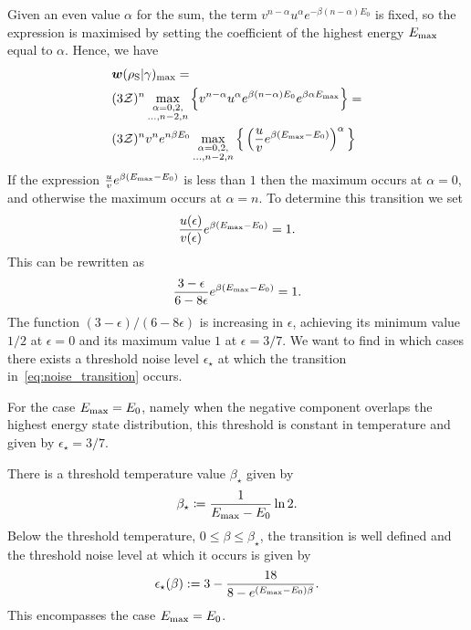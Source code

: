 \documentclass[pra,
aps,
twocolumn,
superscriptaddress,
groupedaddress,
nofootinbib,
reprint
]{revtex4-1}
\begin{document}
Given an even value $\alpha$ for the sum, the term $v^{n-\alpha} u^{\alpha} e^{-\beta (n-\alpha)E_0}$ is fixed, so the expression is maximised by setting the coefficient of the highest energy $E_{\rm{max}}$ equal to $\alpha$.
Hence, we have
\begin{align}
	&\bm{w}(\rho_{\rm{S}} | \gamma)_{\rm{max}} = \nonumber\\
	&(3\mathcal{Z})^{n} \max\limits_{\substack{\alpha = 0,2, \\ \dots,n-2,n}}{\Big\{ v^{n-\alpha} u^{\alpha} e^{\beta (n-\alpha)E_0} e^{\beta \alpha E_{\rm{max}}} \Big\}} =  \nonumber\\
	&(3\mathcal{Z})^{n} v^n e^{n\beta E_0}\max\limits_{\substack{\alpha = 0,2, \\ \dots,n-2,n}}{\Big\{ \left( \frac{u}{v} e^{\beta (E_{\rm{max}} - E_0)} \right)^{\alpha} \Big\}}
\end{align}
If the expression $\frac{u}{v} e^{\beta (E_{\rm{max}} - E_0)}$ is less than $1$ then the maximum occurs at $\alpha=0$, and otherwise the maximum occurs at $\alpha = n$. To determine this transition we set
\begin{equation}
	\frac{u(\epsilon)}{v(\epsilon)} e^{\beta (E_{\rm{max}} - E_0)} = 1.
\end{equation}
This can be rewritten as
\begin{equation}\label{eq:noise_transition}
	\frac{3-\epsilon}{6-8\epsilon} e^{\beta (E_{\rm{max}} - E_0)} = 1.
\end{equation}
The function $(3-\epsilon) / (6-8\epsilon)$ is increasing in $\epsilon$, achieving its minimum value $1/2$ at $\epsilon = 0$ and its maximum value $1$ at $\epsilon = 3/7$.
We want to find in which cases there exists a threshold noise level $\epsilon_\star$ at which the transition in~\cref{eq:noise_transition} occurs.

For the case $E_{\rm{max}} = E_0$, namely when the negative component overlaps the highest energy state distribution, this threshold is constant in temperature and given by $\epsilon_{\star} = 3/7$. 

There is a threshold temperature value $\beta_\star$ given by
\begin{equation}
	\beta_{\star} \coloneqq \frac{1}{E_{\rm{max}} - E_0} \ln2.
\end{equation}
Below the threshold temperature, $0 \leq \beta \leq \beta_\star$, the transition is well defined and the threshold noise level at which it occurs is given by
\begin{equation}
	\epsilon_{\star}(\beta) := 3 - \dfrac{18}{8-e^{(E_{\rm{max}} - E_0)\beta}}.
\end{equation}
This encompasses the case $E_{\rm{max}} = E_0$.
\end{document}

